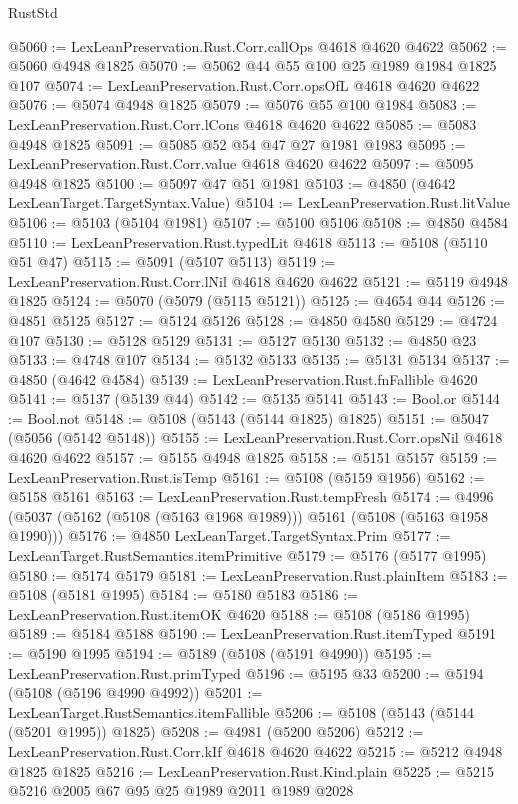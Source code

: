 \begin{lexlean}{RustStd}
\begin{coremodule}
@5060 := LexLeanPreservation.Rust.Corr.callOps @4618 @4620 @4622
@5062 := @5060 @4948 @1825
@5070 := @5062 @44 @55 @100 @25 @1989 @1984 @1825 @107
@5074 := LexLeanPreservation.Rust.Corr.opsOfL @4618 @4620 @4622
@5076 := @5074 @4948 @1825
@5079 := @5076 @55 @100 @1984
@5083 := LexLeanPreservation.Rust.Corr.lCons @4618 @4620 @4622
@5085 := @5083 @4948 @1825
@5091 := @5085 @52 @54 @47 @27 @1981 @1983
@5095 := LexLeanPreservation.Rust.Corr.value @4618 @4620 @4622
@5097 := @5095 @4948 @1825
@5100 := @5097 @47 @51 @1981
@5103 := @4850 (@4642 LexLeanTarget.TargetSyntax.Value)
@5104 := LexLeanPreservation.Rust.litValue
@5106 := @5103 (@5104 @1981)
@5107 := @5100 @5106
@5108 := @4850 @4584
@5110 := LexLeanPreservation.Rust.typedLit @4618
@5113 := @5108 (@5110 @51 @47)
@5115 := @5091 (@5107 @5113)
@5119 := LexLeanPreservation.Rust.Corr.lNil @4618 @4620 @4622
@5121 := @5119 @4948 @1825
@5124 := @5070 (@5079 (@5115 @5121))
@5125 := @4654 @44
@5126 := @4851 @5125
@5127 := @5124 @5126
@5128 := @4850 @4580
@5129 := @4724 @107
@5130 := @5128 @5129
@5131 := @5127 @5130
@5132 := @4850 @23
@5133 := @4748 @107
@5134 := @5132 @5133
@5135 := @5131 @5134
@5137 := @4850 (@4642 @4584)
@5139 := LexLeanPreservation.Rust.fnFallible @4620
@5141 := @5137 (@5139 @44)
@5142 := @5135 @5141
@5143 := Bool.or
@5144 := Bool.not
@5148 := @5108 (@5143 (@5144 @1825) @1825)
@5151 := @5047 (@5056 (@5142 @5148))
@5155 := LexLeanPreservation.Rust.Corr.opsNil @4618 @4620 @4622
@5157 := @5155 @4948 @1825
@5158 := @5151 @5157
@5159 := LexLeanPreservation.Rust.isTemp
@5161 := @5108 (@5159 @1956)
@5162 := @5158 @5161
@5163 := LexLeanPreservation.Rust.tempFresh
@5174 := @4996 (@5037 (@5162 (@5108 (@5163 @1968 @1989))) @5161 (@5108 (@5163 @1958 @1990)))
@5176 := @4850 LexLeanTarget.TargetSyntax.Prim
@5177 := LexLeanTarget.RustSemantics.itemPrimitive
@5179 := @5176 (@5177 @1995)
@5180 := @5174 @5179
@5181 := LexLeanPreservation.Rust.plainItem
@5183 := @5108 (@5181 @1995)
@5184 := @5180 @5183
@5186 := LexLeanPreservation.Rust.itemOK @4620
@5188 := @5108 (@5186 @1995)
@5189 := @5184 @5188
@5190 := LexLeanPreservation.Rust.itemTyped
@5191 := @5190 @1995
@5194 := @5189 (@5108 (@5191 @4990))
@5195 := LexLeanPreservation.Rust.primTyped
@5196 := @5195 @33
@5200 := @5194 (@5108 (@5196 @4990 @4992))
@5201 := LexLeanTarget.RustSemantics.itemFallible
@5206 := @5108 (@5143 (@5144 (@5201 @1995)) @1825)
@5208 := @4981 (@5200 @5206)
@5212 := LexLeanPreservation.Rust.Corr.kIf @4618 @4620 @4622
@5215 := @5212 @4948 @1825 @1825
@5216 := LexLeanPreservation.Rust.Kind.plain
@5225 := @5215 @5216 @2005 @67 @95 @25 @1989 @2011 @1989 @2028

\end{coremodule}
\end{lexlean}
